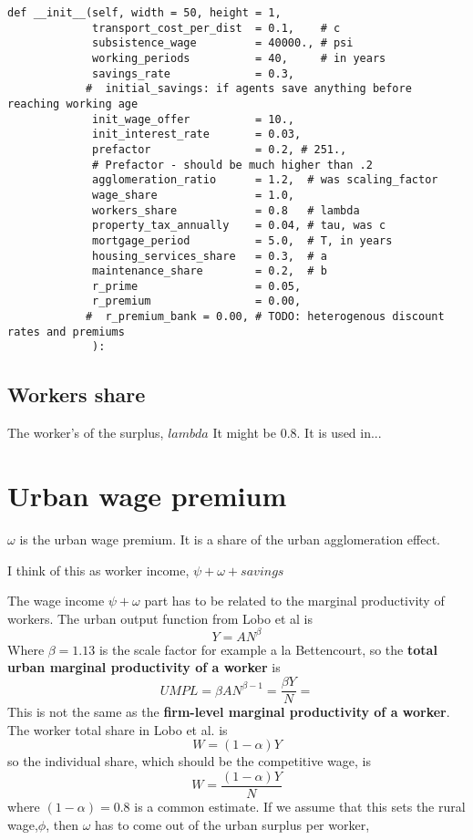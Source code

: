 \begin{lstlisting}
def __init__(self, width = 50, height = 1,
             transport_cost_per_dist  = 0.1,    # c
             subsistence_wage         = 40000., # psi
             working_periods          = 40,     # in years
             savings_rate             = 0.3,
            #  initial_savings: if agents save anything before reaching working age
             init_wage_offer          = 10.,
             init_interest_rate       = 0.03,
             prefactor                = 0.2, # 251., 
             # Prefactor - should be much higher than .2
             agglomeration_ratio      = 1.2,  # was scaling_factor
             wage_share               = 1.0,
             workers_share            = 0.8   # lambda
             property_tax_annually    = 0.04, # tau, was c
             mortgage_period          = 5.0,  # T, in years
             housing_services_share   = 0.3,  # a
             maintenance_share        = 0.2,  # b
             r_prime                  = 0.05,
             r_premium                = 0.00,
            #  r_premium_bank = 0.00, # TODO: heterogenous discount rates and premiums
             ):
\end{lstlisting}

\subsection{Workers share}
The worker's of the surplus, $lambda$ It might be 0.8. It is used in...

\section{Urban wage premium}

$\omega$ is the urban wage premium. It is a share of the urban agglomeration effect. 

I think of this as worker income, $\psi + \omega + savings$ 

The wage income  $\psi + \omega$ part has to be related to the marginal productivity of workers. The urban output function from Lobo et al \cite{loboUrbanScalingProduction2013} is  
\[Y=AN^\beta\]
Where $\beta=1.13$ is the scale factor for example  a la Bettencourt, so the \textbf{total urban marginal productivity of a worker} is  
\[UMPL=\beta AN^{\beta-1}=\frac{\beta Y}{N} =\]
This is not the same as the \textbf{firm-level marginal productivity of a worker}. The worker total share in Lobo et al. is \[W= (1-\alpha)Y \] 
so the individual share, which should be the competitive wage, is
\[W= \frac{(1-\alpha)Y}{N} \] 
where $(1-\alpha)=0.8$ is a common estimate. If we assume that this sets the rural wage,$\phi$, then $\omega$ has to come out of the  urban surplus per worker,

